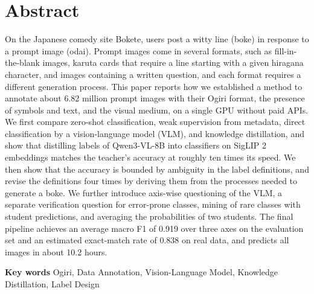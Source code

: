 \section*{Abstract}
On the Japanese comedy site Bokete, users post a witty line (boke) in response to a prompt image (odai).
Prompt images come in several formats, such as fill-in-the-blank images, karuta cards that require a line starting with a given hiragana character, and images containing a written question, and each format requires a different generation process.
This paper reports how we established a method to annotate about 6.82 million prompt images with their Ogiri format, the presence of symbols and text, and the visual medium, on a single GPU without paid APIs.
We first compare zero-shot classification, weak supervision from metadata, direct classification by a vision-language model (VLM), and knowledge distillation, and show that distilling labels of Qwen3-VL-8B into classifiers on SigLIP 2 embeddings matches the teacher's accuracy at roughly ten times its speed.
We then show that the accuracy is bounded by ambiguity in the label definitions, and revise the definitions four times by deriving them from the processes needed to generate a boke.
We further introduce axis-wise questioning of the VLM, a separate verification question for error-prone classes, mining of rare classes with student predictions, and averaging the probabilities of two students.
The final pipeline achieves an average macro F1 of 0.919 over three axes on the evaluation set and an estimated exact-match rate of 0.838 on real data, and predicts all images in about 10.2 hours.
\par
\noindent
{\bf Key words} Ogiri, Data Annotation, Vision-Language Model, Knowledge Distillation, Label Design
